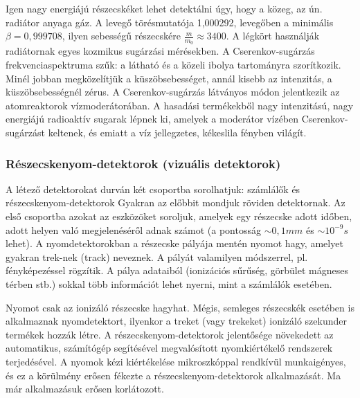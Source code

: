 \documentclass[../main.tex]{subfiles}
\begin{document}
Igen nagy energiájú részecskéket lehet detektálni úgy, hogy a közeg, az ún. radiátor anyaga gáz. A levegő törésmutatója 1,000292, levegőben a
minimális $\beta = 0,999708$, ilyen sebességű részecskére $\frac{m}{m_0} \approx 3400$. A légkört
használják radiátornak egyes kozmikus sugárzási mérésekben. A Cserenkov-sugárzás frekvenciaspektruma szűk: a látható és a közeli
ibolya tartományra szorítkozik. Minél jobban megközelítjük a küszöbsebességet, annál kisebb az intenzitás, a küszöbsebességnél zérus. A Cserenkov-sugárzás látványos módon
jelentkezik az atomreaktorok vízmoderátorában. A hasadási termékekből nagy intenzitású, nagy energiájú radioaktív sugarak lépnek ki, amelyek a moderátor vízében Cserenkov-sugárzást keltenek,
és emiatt a víz jellegzetes, kékeslila fényben világít.

\subsubsection{Részecskenyom-detektorok (vizuális detektorok)}
A létező detektorokat durván két csoportba sorolhatjuk: számlálők és
részecskenyom-detektorok Gyakran az előbbit mondjuk röviden detektornak. Az első csoportba azokat az eszközöket soroljuk, amelyek egy részecske
adott időben, adott helyen való megjelenéséről adnak számot (a pontosság $\sim 0,1 mm$ és $\sim 10^{-9} s$ lehet). A nyomdetektorokban a részecske pályája
mentén nyomot hagy, amelyet gyakran trek-nek (track) neveznek. A pályát
valamilyen módszerrel, pl. fényképezéssel rögzítik. A pálya adataiból (ionizációs sűrűség, görbület mágneses térben stb.) sokkal több információt lehet
nyerni, mint a számlálók esetében. 

Nyomot csak az ionizáló részecske hagyhat. Mégis, semleges részecskék
esetében is alkalmaznak nyomdetektort, ilyenkor a treket (vagy trekeket)
ionizáló szekunder termékek hozzák létre.
A részecskenyom-detektorok jelentősége növekedett az automatikus,
számítógép segítésével megvalósított nyomkiértékelő rendszerek terjedésével. A nyomok kézi kiértékelése mikroszkóppal rendkívül munkaigényes, és
ez a körülmény erősen fékezte a részecskenyom-detektorok alkalmazását. Ma már alkalmazásuk erősen korlátozott.
\end{document}
